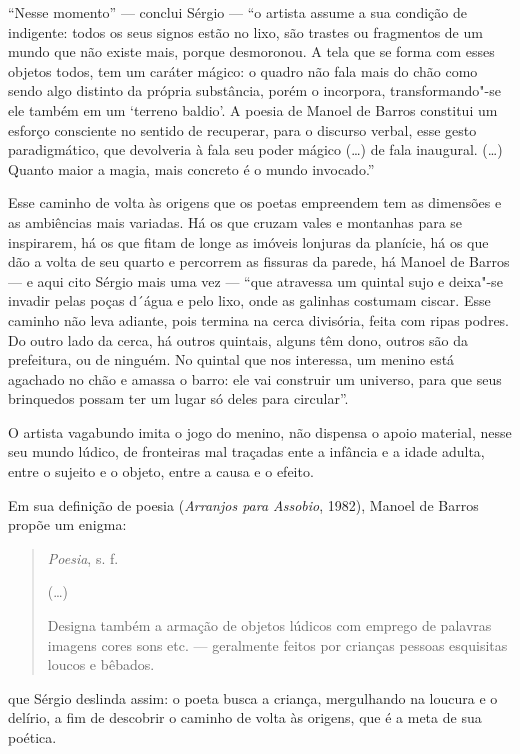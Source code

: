 ``Nesse momento'' --- conclui Sérgio --- ``o artista assume a sua condição
de indigente: todos os seus signos estão no lixo, são trastes ou
fragmentos de um mundo que não existe mais, porque desmoronou. A tela
que se forma com esses objetos todos, tem um caráter mágico: o quadro
não fala mais do chão como sendo algo distinto da própria substância,
porém o incorpora, transformando"-se ele também em um `terreno baldio'.
A poesia de Manoel de Barros constitui um esforço consciente no sentido
de recuperar, para o discurso verbal, esse gesto paradigmático, que
devolveria à fala seu poder mágico (\ldots{}) de fala inaugural. (\ldots{}) Quanto
maior a magia, mais concreto é o mundo invocado.''

Esse caminho de volta às origens que os poetas empreendem tem as
dimensões e as ambiências mais variadas. Há os que cruzam vales e
montanhas para se inspirarem, há os que fitam de longe as imóveis
lonjuras da planície, há os que dão a volta de seu quarto e percorrem as
fissuras da parede, há Manoel de Barros --- e aqui cito Sérgio mais uma
vez --- ``que atravessa um quintal sujo e deixa"-se invadir pelas poças
d´água e pelo lixo, onde as galinhas costumam ciscar. Esse caminho não
leva adiante, pois termina na cerca divisória, feita com ripas podres.
Do outro lado da cerca, há outros quintais, alguns têm dono, outros são
da prefeitura, ou de ninguém. No quintal que nos interessa, um menino
está agachado no chão e amassa o barro: ele vai construir um universo,
para que seus brinquedos possam ter um lugar só deles para circular''.

O artista vagabundo imita o jogo do menino, não dispensa o apoio
material, nesse seu mundo lúdico, de fronteiras mal traçadas ente a
infância e a idade adulta, entre o sujeito e o objeto, entre a causa e o
efeito.

Em sua definição de poesia (\emph{Arranjos para Assobio}, 1982), Manoel
de Barros propõe um enigma:

\begin{quote}
\emph{Poesia}, s. f.

(\ldots{})

Designa também a armação de objetos lúdicos
com emprego de palavras imagens cores sons
etc. --- geralmente feitos por crianças pessoas
esquisitas loucos e bêbados.
\end{quote}

que Sérgio deslinda assim: o poeta busca a criança, mergulhando na
loucura e o delírio, a fim de descobrir o caminho de volta às origens,
que é a meta de sua poética.

